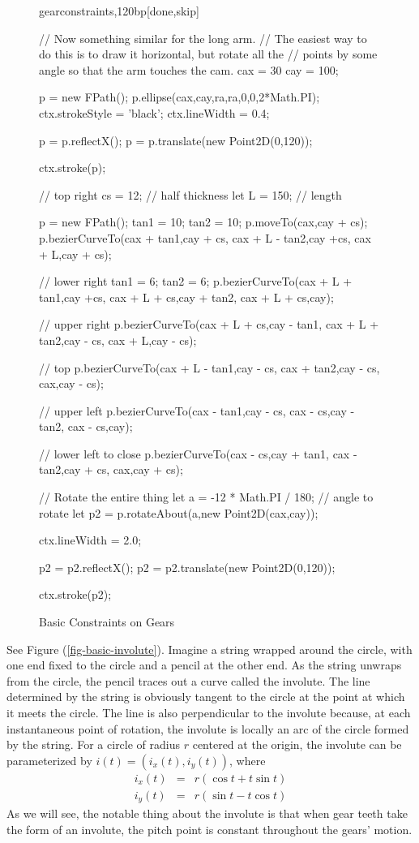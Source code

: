 \documentclass[10pt]{article}
\begin{document}
\begin{figure}
\begin{figput}{gearconstraints,120bp}[done,skip]
{  // Now something similar for the long arm.
  // The easiest way to do this is to draw it horizontal, but rotate all the
  // points by some angle so that the arm touches the cam.
  cax = 30
  cay = 100;
  
  p = new FPath();
  p.ellipse(cax,cay,ra,ra,0,0,2*Math.PI);
  ctx.strokeStyle = 'black';
  ctx.lineWidth = 0.4;

  p = p.reflectX();
  p = p.translate(new Point2D(0,120));

  ctx.stroke(p);

  // top right
  cs = 12; // half thickness
  let L = 150; // length

  p = new FPath();
  tan1 = 10;
  tan2 = 10;
  p.moveTo(cax,cay + cs);
  p.bezierCurveTo(cax + tan1,cay + cs,
    cax + L - tan2,cay +cs,
    cax + L,cay + cs);

  // lower right
  tan1 = 6;
  tan2 = 6;
  p.bezierCurveTo(cax + L + tan1,cay +cs,
    cax + L + cs,cay + tan2,
    cax + L + cs,cay);

  // upper right
  p.bezierCurveTo(cax + L + cs,cay - tan1,
    cax + L + tan2,cay - cs,
    cax + L,cay - cs);

  // top
  p.bezierCurveTo(cax + L - tan1,cay - cs,
    cax + tan2,cay - cs,
    cax,cay - cs);

  // upper left
  p.bezierCurveTo(cax - tan1,cay - cs,
    cax - cs,cay - tan2,
    cax - cs,cay);

  // lower left to close
  p.bezierCurveTo(cax - cs,cay + tan1,
    cax - tan2,cay + cs,
    cax,cay + cs);

  // Rotate the entire thing
  let a = -12 * Math.PI / 180; // angle to rotate
  let p2 = p.rotateAbout(a,new Point2D(cax,cay));
  
  ctx.lineWidth = 2.0;

  p2 = p2.reflectX();
  p2 = p2.translate(new Point2D(0,120));

  ctx.stroke(p2);
}
\end{figput}
\caption{Basic Constraints on Gears}
\label{fig-basic-gear-constraints}
\end{figure}

See Figure (\ref{fig-basic-involute}). 
Imagine a string wrapped around the circle, with one end fixed to the
circle and a pencil at the other end. As the string unwraps from the
circle, the pencil traces out a 
curve called the involute. The line determined by the string is
obviously tangent to the circle at the point at which it meets the circle. The
line is also perpendicular to the involute because, at each
instantaneous point of rotation, the involute is locally an arc of the
circle formed by the string. For a circle of radius $r$ centered at the
origin, the involute can be parameterized by $i(t)=(i_x(t),i_y(t))$, where
\begin{eqnarray*}
i_x(t) &=& r (\cos t + t \sin t) \\
i_y(t) &=& r (\sin t - t \cos t)
\end{eqnarray*}
As we will see, the notable thing about the involute is that when gear
teeth take the form of an involute, the pitch point is constant
throughout the gears' motion. 
\end{document}
